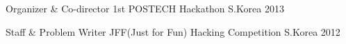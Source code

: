 

\begin{cvhonors}

  \cvhonor
    {Organizer \& Co-director} %
    {1st POSTECH Hackathon} %
    {S.Korea} %
    {2013} %

  \cvhonor
    {Staff \& Problem Writer} %
    {JFF(Just for Fun) Hacking Competition} %
    {S.Korea} %
    {2012} %

\end{cvhonors}

